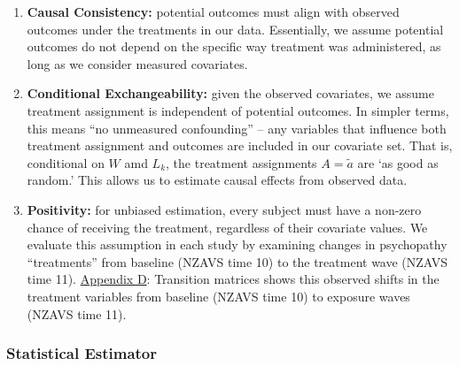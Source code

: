 \documentclass[
  single column]{article}
\begin{document}
\begin{enumerate}
\def\labelenumi{\arabic{enumi}.}
\item
  \textbf{Causal Consistency:} potential outcomes must align with
  observed outcomes under the treatments in our data. Essentially, we
  assume potential outcomes do not depend on the specific way treatment
  was administered, as long as we consider measured covariates.
\item
  \textbf{Conditional Exchangeability:} given the observed covariates,
  we assume treatment assignment is independent of potential outcomes.
  In simpler terms, this means ``no unmeasured confounding'' -- any
  variables that influence both treatment assignment and outcomes are
  included in our covariate set. That is, conditional on \(W\) amd
  \(L_k\), the treatment assignments \(A = \tilde{a}\) are `as good as
  random.' This allows us to estimate causal effects from observed data.
\item
  \textbf{Positivity:} for unbiased estimation, every subject must have
  a non-zero chance of receiving the treatment, regardless of their
  covariate values. We evaluate this assumption in each study by
  examining changes in psychopathy ``treatments'' from baseline (NZAVS
  time 10) to the treatment wave (NZAVS time 11).
  \href{appendix-positivity}{Appendix D}: Transition matrices shows this
  observed shifts in the treatment variables from baseline (NZAVS time
  10) to exposure waves (NZAVS time 11).
\end{enumerate}

\subsubsection{Statistical Estimator}\label{statistical-estimator}
\end{document}
